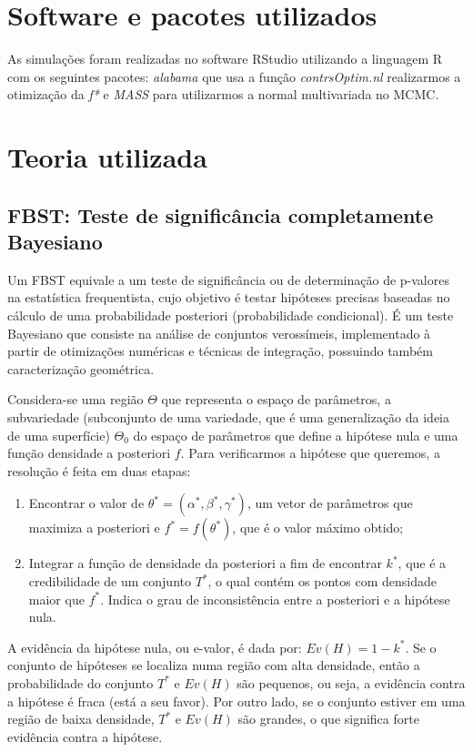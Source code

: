 \documentclass{article} %
\begin{document}
\section{Software e pacotes utilizados}
	As simulações foram realizadas no software RStudio utilizando a linguagem R com os seguintes pacotes: \textit{alabama} que usa a função \textit{contrsOptim.nl} realizarmos a otimização da \textit{f*} e \textit{MASS} para utilizarmos a normal multivariada no MCMC.
	
\section{Teoria utilizada}
	
\subsection{FBST: Teste de significância completamente Bayesiano}	
	
	Um FBST equivale a um teste de significância ou de determinação de p-valores na estatística frequentista, cujo objetivo é testar hipóteses precisas baseadas no cálculo de uma probabilidade posteriori (probabilidade condicional). É um teste Bayesiano que consiste na análise de conjuntos verossímeis, implementado à partir de otimizações numéricas e técnicas de integração, possuindo também caracterização geométrica.

Considera-se uma região $\Theta$ que representa o espaço de parâmetros, a subvariedade  (subconjunto de uma variedade, que é uma generalização da ideia de uma superfície) $\Theta_0$ do espaço de parâmetros que define a hipótese nula e uma função densidade a posteriori $f$. Para verificarmos a hipótese que queremos, a resolução é feita em duas etapas:
    
\begin{enumerate}
\item Encontrar o valor de $\theta^* = (\alpha^*, \beta^*, \gamma^*)$, um vetor de parâmetros que maximiza a posteriori  e $ f^* = f(\theta^*)$, que é o valor máximo obtido;
	\item Integrar a função de densidade da posteriori a fim de encontrar $k^*$, que é a credibilidade de um conjunto $T^*$, o qual contém os pontos com densidade maior que $f^*$. Indica o grau de inconsistência entre a posteriori e a hipótese nula.
\end{enumerate}

	A evidência da hipótese nula, ou e-valor, é dada por: $Ev(H) = 1 - k^*$. Se o conjunto de hipóteses se localiza numa região com alta densidade, então a probabilidade do conjunto $T^*$ e $Ev(H)$ são pequenos, ou seja, a evidência contra a hipótese é fraca (está a seu favor). Por outro lado, se o conjunto estiver em uma região de baixa densidade, $T^*$ e $Ev(H)$ são grandes, o que significa forte evidência contra a hipótese.
	
\end{document}
